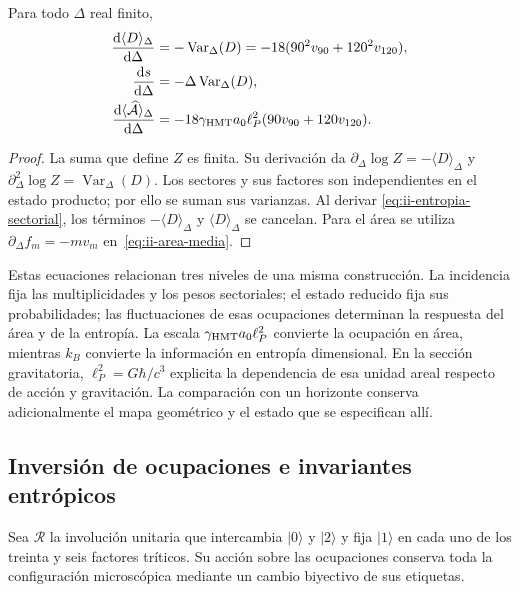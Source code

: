 \begin{proposition}
Para todo $\Delta$ real finito,
\begin{align}
 \frac{\mathrm d\langle D\rangle_\Delta}{\mathrm d\Delta}
 &=-\operatorname{Var}_\Delta(D)
   =-18(90^2v_{90}+120^2v_{120}),\\
 \frac{\mathrm d s}{\mathrm d\Delta}
 &=-\Delta\operatorname{Var}_\Delta(D),
 \label{eq:ii-respuesta-entropica}\\
 \frac{\mathrm d\langle\widehat{\mathcal A}\rangle_\Delta}{\mathrm d\Delta}
 &=-18\gamma_{\mathrm{HMT}}a_0\ell_P^2(90v_{90}+120v_{120}).
 \label{eq:ii-respuesta-areal}
\end{align}
\end{proposition}
\begin{proof}
La suma que define $Z$ es finita. Su derivación da
$\partial_\Delta\log Z=-\langle D\rangle_\Delta$ y
$\partial_\Delta^2\log Z=\operatorname{Var}_\Delta(D)$.
Los sectores y sus factores son independientes en el estado producto;
por ello se suman sus varianzas. Al derivar
\eqref{eq:ii-entropia-sectorial}, los términos
$-\langle D\rangle_\Delta$ y $\langle D\rangle_\Delta$
se cancelan. Para el área se utiliza
$\partial_\Delta f_m=-mv_m$ en~\eqref{eq:ii-area-media}.
\end{proof}

Estas ecuaciones relacionan tres niveles de una misma construcción.
La incidencia fija las multiplicidades y los pesos sectoriales; el
estado reducido fija sus probabilidades; las fluctuaciones de esas
ocupaciones determinan la respuesta del área y de la entropía.
La escala $\gamma_{\mathrm{HMT}}a_0\ell_P^2$ convierte la ocupación en área,
mientras $k_B$ convierte la información en entropía dimensional.
En la sección gravitatoria, $\ell_P^2=G\hbar/c^3$ explicita
la dependencia de esa unidad areal respecto de acción y gravitación.
La comparación con un horizonte conserva adicionalmente el mapa
geométrico y el estado que se especifican allí.

\subsection{Inversión de ocupaciones e invariantes entrópicos}
\label{sec:ii-inversion-sectorial}

Sea $\mathcal R$ la involución unitaria que intercambia $|0\rangle$
y $|2\rangle$ y fija $|1\rangle$ en cada uno de los treinta y seis
factores tríticos. Su acción sobre las ocupaciones conserva toda la
configuración microscópica mediante un cambio biyectivo de sus etiquetas.

